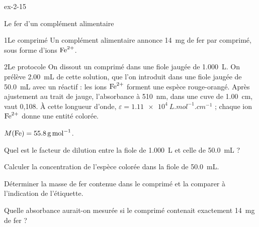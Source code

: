 \begin{blocLivre}{ex-2-15}
\begin{exercice}[3]{Le fer d'un complément alimentaire}
\begin{docu}{1}{Le comprimé}
Un complément alimentaire annonce \qty{14}{mg} de fer par comprimé, sous forme d'ions $\ce{Fe^{2+}}$.
\end{docu}
\begin{docu}{2}{Le protocole}
On dissout un comprimé dans une fiole jaugée de \qty{1,000}{L}. On prélève \qty{2,00}{mL} de cette solution, que l'on introduit dans une
fiole jaugée de \qty{50,0}{mL} avec un réactif : les ions $\ce{Fe^{2+}}$ forment une espèce rouge-orangé. Après ajustement au trait de
jauge, l'absorbance à \qty{510}{nm}, dans une cuve de \qty{1,00}{cm}, vaut 0,108. À cette longueur d'onde, $\varepsilon=\qty{1,11e4}{L.mol^{-1}.cm^{-1}}$ ; chaque ion
$\ce{Fe^{2+}}$ donne une entité colorée.
\end{docu}
\begin{donnees}
$M(\ce{Fe})=\qty{55,8}{g.mol^{-1}}$.
\end{donnees}
\begin{questions}
\item Quel est le facteur de dilution entre la fiole de \qty{1,000}{L} et celle de \qty{50,0}{mL} ?
\item Calculer la concentration de l'espèce colorée dans la fiole de \qty{50,0}{mL}.
\item \initiative Déterminer la masse de fer contenue dans le comprimé et la comparer à l'indication de l'étiquette.
\item Quelle absorbance aurait-on mesurée si le comprimé contenait exactement \qty{14}{mg} de fer ?
\end{questions}
\end{exercice}
\end{blocLivre}
